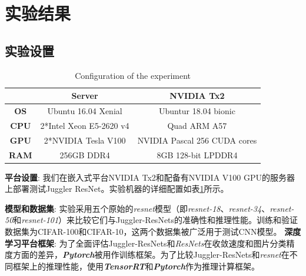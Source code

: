 \section{实验结果}

\subsection{实验设置}

\begin{table}[h]
	\caption{Configuration of the experiment}
	\centering
	\begin{tabular}{ccc}
		\hline
		& \textbf{Server}                            & \textbf{NVIDIA Tx2}                      \\ \hline
		\textbf{OS}  & Ubuntu 16.04 Xenial               & Ubuntur 18.04 bionic           \\ 
		\textbf{CPU} & 2*Intel Xeon E5-2620 v4     &Quad ARM A57 \\ 
		\textbf{GPU} & 2*NVIDIA Tesla V100               & NVIDIA Pascal 256 CUDA cores   \\ 
		\textbf{RAM} & 256GB DDR4                        & 8GB 128-bit LPDDR4             \\ \hline
	\end{tabular} %
	\label{configuration}
\end{table}


\textbf{平台设置}: 我们在嵌入式平台NVIDIA Tx2和配备有NVIDIA V100 GPU的服务器上部署测试Juggler ResNet。实验机器的详细配置如表\ref{configuration}所示。

\textbf{模型和数据集}: 实验采用五个原始的\emph{resnet}模型（即\emph{resnet-18}、\emph{resnet-34}、\emph{resnet-50}和\emph{resnet-101}）来比较它们与Juggler-ResNets的准确性和推理性能。训练和验证数据集为CIFAR-100和CIFAR-10，这两个数据集被广泛用于测试CNN模型。
%
\textbf{深度学习平台框架}: 为了全面评估Juggler-ResNets和\emph{ResNets}在收敛速度和图片分类精度方面的差异，\textbf{\emph{Pytorch}}被用作训练框架。为了比较Juggler-ResNets和\emph{resnet}在不同框架上的推理性能，使用\textbf{\emph{TensorRT}}和\textbf{\emph{Pytorch}}作为推理计算框架\cite{2009learning}。

